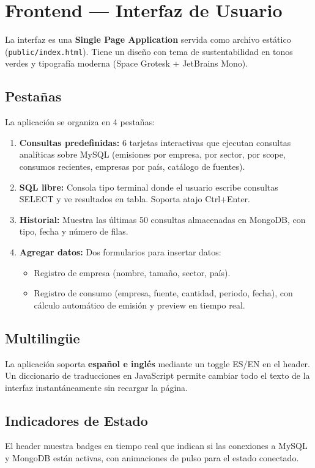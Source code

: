 \documentclass[12pt, a4paper]{article}
\begin{document}
\section{Frontend --- Interfaz de Usuario}
La interfaz es una \textbf{Single Page Application} servida como archivo estático (\texttt{public/index.html}). Tiene un diseño con tema de sustentabilidad en tonos verdes y tipografía moderna (Space Grotesk + JetBrains Mono).
\subsection{Pestañas}
La aplicación se organiza en 4 pestañas:
\begin{enumerate}[nosep]
  \item \textbf{Consultas predefinidas:} 6 tarjetas interactivas que ejecutan consultas analíticas sobre MySQL (emisiones por empresa, por sector, por scope, consumos recientes, empresas por país, catálogo de fuentes).
  \item \textbf{SQL libre:} Consola tipo terminal donde el usuario escribe consultas SELECT y ve resultados en tabla. Soporta atajo Ctrl+Enter.
  \item \textbf{Historial:} Muestra las últimas 50 consultas almacenadas en MongoDB, con tipo, fecha y número de filas.
  \item \textbf{Agregar datos:} Dos formularios para insertar datos:
  \begin{itemize}[nosep]
    \item Registro de empresa (nombre, tamaño, sector, país).
    \item Registro de consumo (empresa, fuente, cantidad, periodo, fecha), con cálculo automático de emisión y preview en tiempo real.
  \end{itemize}
\end{enumerate}
\subsection{Multilingüe}
La aplicación soporta \textbf{español e inglés} mediante un toggle ES/EN en el header. Un diccionario de traducciones en JavaScript permite cambiar todo el texto de la interfaz instantáneamente sin recargar la página.
\subsection{Indicadores de Estado}
El header muestra badges en tiempo real que indican si las conexiones a MySQL y MongoDB están activas, con animaciones de pulso para el estado conectado.
\end{document}
